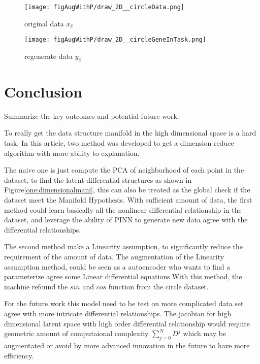 \documentclass{article}
\begin{document}
\begin{figure}[ht!]
    \centering
    \begin{minipage}{0.45\textwidth}
        \centering
        \texttt{[image: figAugWithP/draw\_2D\_\_circleData.png]} %
        \caption{original data $x_\delta$}
        \label{fig:fig4}
    \end{minipage}\hfill
    \begin{minipage}{0.45\textwidth}
        \centering
        \texttt{[image: figAugWithP/draw\_2D\_\_circleGeneInTask.png]} %
        \caption{regenerate data $y_\delta$}
    \end{minipage}
\end{figure}

\section{Conclusion}
Summarize the key outcomes and potential future work.

To really get the data structure manifold in the
high dimensional space is a hard task. In this article,
two method was developed to get a dimension reduce
algorithm with more ability to explanation.

The naive one
is just compute the PCA of neighborhood of each point
in the dataset, to find the latent differential structures
as shown in Figure\ref{one:dimensionalmani}, this can also
be treated as the global check if the dataset meet the
Manifold Hypothesis. With sufficient amount of data, the first
method could learn basically all the nonlinear differential
relationship in the dataset, and leverage the ability of
PINN \cite[PINN]{raissi2017physics} to generate new data agree
with the differential relationships.

The second method make a Linearity assumption, to significantly
reduce the requirement of the amount of data.
The augmentation of the Linearity assumption method, could be
seen as a autoencoder who wants to find a parameterize agree
some Linear differential equations.With this method, the machine
refound the $sin$ and $cos$ function from the circle dataset.

For the future work this model need to be test on more
complicated data set agree with more intricate differential relationships.
The jacobian for high dimensional latent space with high order differential relationship
would require geometric amount of computaional complexity $\sum_{j=0}^{N} D^{j}$ which may be augmentated or
avoid by more advanced innovation in the future to have more efficiency.

\end{document}
